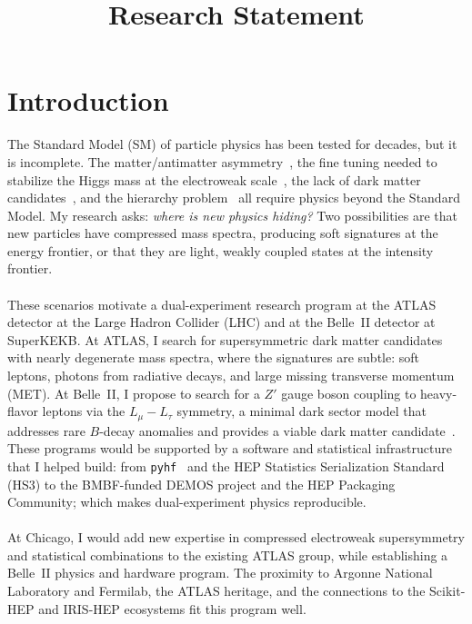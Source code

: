 \documentclass[10pt,a4paper,sans]{moderncv} %
\title{Research Statement}
\begin{document}
\renewcommand*{\bibliographyhead}[1]{\section{#1}}
\makecvtitle %
\vspace*{-4em}

\section{Introduction}

The Standard Model (SM) of particle physics has been tested for decades, but it is incomplete. The matter/antimatter asymmetry~\cite{canetti2012matter}, the fine tuning needed to stabilize the Higgs mass at the electroweak scale~\cite{Baer:2013ava}, the lack of dark matter candidates~\cite{bertone2005particle,Ade:2015xua}, and the hierarchy problem~\cite{tHooft:1980xss} all require physics beyond the Standard Model. My research asks: \textit{where is new physics hiding?} Two possibilities are that new particles have compressed mass spectra, producing soft signatures at the energy frontier, or that they are light, weakly coupled states at the intensity frontier.
\\
\\
These scenarios motivate a dual-experiment research program at the ATLAS detector at the Large Hadron Collider (LHC) and at the Belle~II detector at SuperKEKB. At ATLAS, I search for supersymmetric dark matter candidates with nearly degenerate mass spectra, where the signatures are subtle: soft leptons, photons from radiative decays, and large missing transverse momentum (MET). At Belle~II, I propose to search for a $Z'$ gauge boson coupling to heavy-flavor leptons via the $L_\mu - L_\tau$ symmetry, a minimal dark sector model that addresses rare $B$-decay anomalies and provides a viable dark matter candidate~\cite{Altmannshofer:2016jzy}. These programs would be supported by a software and statistical infrastructure that I helped build: from \texttt{pyhf}~\cite{Heinrich2021} and the HEP Statistics Serialization Standard (HS3) to the BMBF-funded DEMOS project and the HEP Packaging Community; which makes dual-experiment physics reproducible.
\\
\\
At Chicago, I would add new expertise in compressed electroweak supersymmetry and statistical combinations to the existing ATLAS group, while establishing a Belle~II physics and hardware program. The proximity to Argonne National Laboratory and Fermilab, the ATLAS heritage, and the connections to the Scikit-HEP and IRIS-HEP ecosystems fit this program well.
\end{document}
